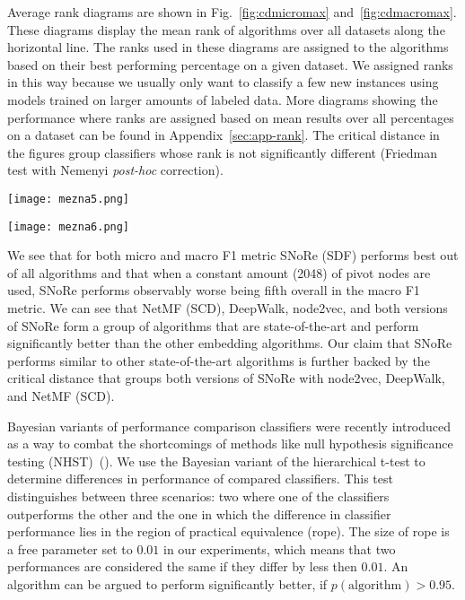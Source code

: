 \documentclass[twoside,11pt]{article}
\begin{document}
Average rank diagrams are shown in Fig.~\ref{fig:cdmicromax} and~\ref{fig:cdmacromax}. These diagrams display the mean rank of algorithms over all datasets along the horizontal line. The ranks used in these diagrams are assigned to the algorithms based on their best performing percentage on a given dataset. We assigned ranks in this way because we usually only want to classify a few new instances using models trained on larger amounts of labeled data. More diagrams showing the performance where ranks are assigned based on mean results over all percentages on a dataset can be found in Appendix~\ref{sec:app-rank}. The critical distance in the figures group classifiers whose rank is not significantly different (Friedman test with Nemenyi \emph{post-hoc} correction).

\begin{figure*}[t!]
  \centering
  \texttt{[image: mezna5.png]}
  \caption{Micro F1 average rank diagram where best performing percentage is chosen.}
  \label{fig:cdmicromax}
\end{figure*}

\begin{figure*}[t!]
  \centering
  \texttt{[image: mezna6.png]}
  \caption{Macro F1 average rank diagram where best performing percentage is chosen.}
  \label{fig:cdmacromax}
\end{figure*}

We see that for both micro and macro F1 metric SNoRe (SDF) performs best out of all algorithms and that when a constant amount (2048) of pivot nodes are used, SNoRe performs observably worse being fifth overall in the macro F1 metric. We can see that NetMF (SCD), DeepWalk, node2vec, and both versions of SNoRe form a group of algorithms that are state-of-the-art and perform significantly better than the other embedding algorithms. Our claim that SNoRe performs similar to other state-of-the-art algorithms is further backed by the critical distance that groups both versions of SNoRe with node2vec, DeepWalk, and NetMF (SCD).

Bayesian variants of performance comparison classifiers were recently introduced as a way to combat the shortcomings of methods like null hypothesis significance testing (NHST)~(\cite{benavoli2017bayes}). We use the Bayesian variant of the hierarchical t-test to determine differences in performance of compared classifiers. This test distinguishes between three scenarios: two where one of the classifiers outperforms the other and the one in which the difference in classifier performance lies in the region of practical equivalence (rope). The size of rope is a free parameter set to $0.01$ in our experiments, which means that two performances are considered the same if they differ by less then $0.01$. An algorithm can be argued to perform significantly better, if $p(\textrm{algorithm})>0.95$.
\end{document}
